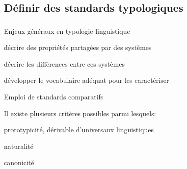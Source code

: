 \subsection{Définir des standards typologiques}

\begin{frame}
\frametitle{}
\begin{wideitemize}
\item Enjeux généraux en typologie linguistique
\begin{smallwideitemize}
  \item décrire des propriétés partagées par des systèmes
  \item {décrire les différences entre ces systèmes}
  \item développer le vocabulaire adéquat pour les caractériser
\end{smallwideitemize}
\item {Emploi de standards comparatifs}
\begin{smallwideitemize}
\item Il existe plusieurs critères possibles parmi lesquels:
\begin{smallwideitemize}\footnotesize
  \item prototypicité, dérivable d'universaux linguistiques \cite{greenberg63}
  \item naturalité \cite{wurzel84,dressler00}
  \item {canonicité \cite{corbett03,corbett07b}}
\end{smallwideitemize}
\end{smallwideitemize}
{}
\end{wideitemize}
\end{frame}

